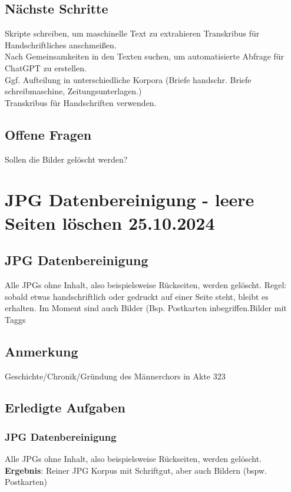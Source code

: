 \documentclass{article}
\begin{document}
\subsection*{Nächste Schritte}
 Skripte schreiben, um maschinelle Text zu extrahieren 
 Transkribus für Handschriftliches anschmeißen. \\
 Nach Gemeinsamkeiten in den Texten suchen, um automatisierte Abfrage für ChatGPT zu erstellen. \\ 
 Ggf. Aufteilung in unterschiedliche Korpora (Briefe handschr. Briefe schreibmaschine, Zeitungsunterlagen.)\\
 Transkribus für Handschriften verwenden. \\

\subsection*{Offene Fragen}
 Sollen die Bilder gelöscht werden?\\


\noindent\hrulefill
\section{JPG Datenbereinigung - leere Seiten löschen \small 25.10.2024 } %

\subsection*{JPG Datenbereinigung}
Alle JPGs ohne Inhalt, also beispielsweise Rückseiten, werden gelöscht. Regel: sobald etwas handschriftlich oder gedruckt auf einer Seite steht, bleibt es erhalten. Im Moment sind auch Bilder (Bsp. Postkarten inbegriffen.Bilder mit Taggs 
\subsection{Anmerkung}
Geschichte/Chronik/Gründung des Männerchors in Akte 323

\subsection*{Erledigte Aufgaben}
\subsubsection*{\small JPG Datenbereinigung }
Alle JPGs ohne Inhalt, also beispielsweise Rückseiten, werden gelöscht.\\
\textbf{Ergebnis}: Reiner JPG Korpus mit Schriftgut, aber auch Bildern (bspw. Postkarten)
\end{document}
